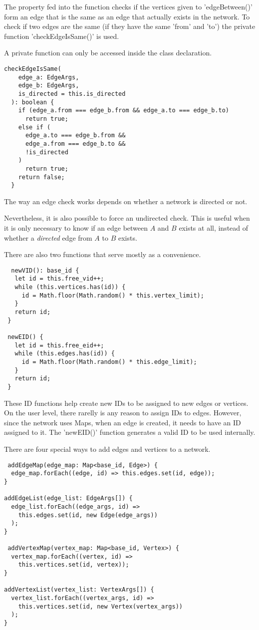 The property fed into the function checks if the vertices given to 'edgeBetween()' form an edge
that is the same as an edge that actually exists in the network. To check if two edges are the same
(if they have the same 'from' and 'to') the private function 'checkEdgeIsSame()' is used.

A private function can only be accessed inside the class declaration.

\begin{verbatim}
checkEdgeIsSame(
    edge_a: EdgeArgs,
    edge_b: EdgeArgs,
    is_directed = this.is_directed
  ): boolean {
    if (edge_a.from === edge_b.from && edge_a.to === edge_b.to)
      return true;
    else if (
      edge_a.to === edge_b.from &&
      edge_a.from === edge_b.to &&
      !is_directed
    )
      return true;
    return false;
  }
\end{verbatim}

The way an edge check works depends on whether a network is directed or not.

Nevertheless, it is also possible to force an undirected check.
This is useful when it is only necessary to know if an edge between $A$ and $B$ exists at all, 
instead of whether a \textit{directed} edge from $A$ to $B$ exists.

There are also two functions that serve mostly as a convenience.

\begin{verbatim}
  newVID(): base_id {
   let id = this.free_vid++;
   while (this.vertices.has(id)) {
     id = Math.floor(Math.random() * this.vertex_limit);
   }
   return id;
 }
 
 newEID() {
   let id = this.free_eid++;
   while (this.edges.has(id)) {
     id = Math.floor(Math.random() * this.edge_limit);
   }
   return id;
 }
\end{verbatim}

These ID functions help create new IDs to be assigned to new edges or vertices.
On the user level, there rarelly is any reason to assign IDs to edges.
However, since the network uses Maps, when an edge is created, it needs to have
an ID assigned to it.
The 'newEID()' function generates a valid ID to be used internally.

There are four special ways to add edges and vertices to a network.

\begin{verbatim}
 addEdgeMap(edge_map: Map<base_id, Edge>) {
  edge_map.forEach((edge, id) => this.edges.set(id, edge));
}

addEdgeList(edge_list: EdgeArgs[]) {
  edge_list.forEach((edge_args, id) =>
    this.edges.set(id, new Edge(edge_args))
  );
}

 addVertexMap(vertex_map: Map<base_id, Vertex>) {
  vertex_map.forEach((vertex, id) =>
    this.vertices.set(id, vertex));
}

addVertexList(vertex_list: VertexArgs[]) {
  vertex_list.forEach((vertex_args, id) =>
    this.vertices.set(id, new Vertex(vertex_args))
  );
}
\end{verbatim}

